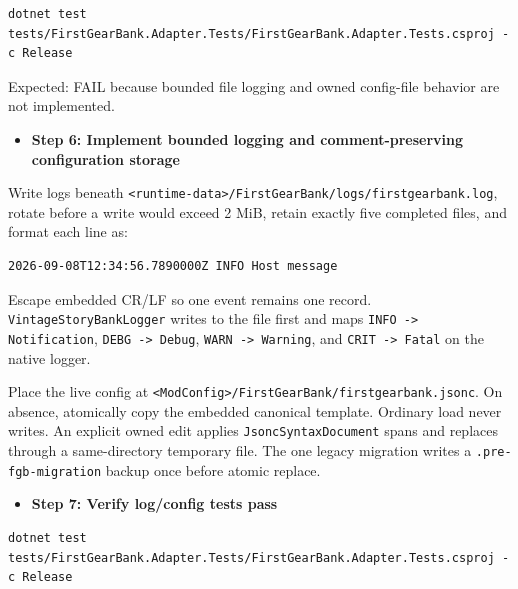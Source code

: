 \documentclass[
  10pt,
  letterpaper,
]{article}
\newcommand{\passthrough}[1]{#1}
\providecommand{\tightlist}{%
  \setlength{\itemsep}{0pt}\setlength{\parskip}{0pt}}
\begin{document}
\begin{lstlisting}
dotnet test tests/FirstGearBank.Adapter.Tests/FirstGearBank.Adapter.Tests.csproj -c Release
\end{lstlisting}

Expected: FAIL because bounded file logging and owned config-file
behavior are not implemented.

\begin{itemize}
\tightlist
\item[$\square$]
  \textbf{Step 6: Implement bounded logging and comment-preserving
  configuration storage}
\end{itemize}

Write logs beneath
\texttt{\textless{}}\allowbreak{}\texttt{runtime-}\allowbreak{}\texttt{data\textgreater{}}\allowbreak{}\texttt{/}\allowbreak{}\texttt{FirstGearBank/}\allowbreak{}\texttt{logs/}\allowbreak{}\texttt{firstgearbank.}\allowbreak{}\texttt{log},
rotate before a write would exceed 2 MiB, retain exactly five completed
files, and format each line as:

\begin{lstlisting}
2026-09-08T12:34:56.7890000Z INFO Host message
\end{lstlisting}

Escape embedded CR/LF so one event remains one record.
\passthrough{\lstinline!VintageStoryBankLogger!} writes to the file
first and maps \passthrough{\lstinline!INFO -> Notification!},
\passthrough{\lstinline!DEBG -> Debug!},
\passthrough{\lstinline!WARN -> Warning!}, and
\passthrough{\lstinline!CRIT -> Fatal!} on the native logger.

Place the live config at
\texttt{\textless{}}\allowbreak{}\texttt{ModConfig\textgreater{}}\allowbreak{}\texttt{/}\allowbreak{}\texttt{FirstGearBank/}\allowbreak{}\texttt{firstgearbank.}\allowbreak{}\texttt{jsonc}.
On absence, atomically copy the embedded canonical template. Ordinary
load never writes. An explicit owned edit applies
\passthrough{\lstinline!JsoncSyntaxDocument!} spans and replaces through
a same-directory temporary file. The one legacy migration writes a
\passthrough{\lstinline!.pre-fgb-migration!} backup once before atomic
replace.

\begin{itemize}
\tightlist
\item[$\square$]
  \textbf{Step 7: Verify log/config tests pass}
\end{itemize}

\begin{lstlisting}
dotnet test tests/FirstGearBank.Adapter.Tests/FirstGearBank.Adapter.Tests.csproj -c Release
\end{lstlisting}
\end{document}
